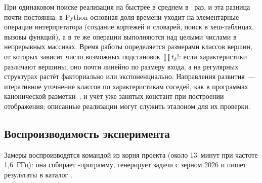 При одинаковом поиске реализация на \Cpp{} быстрее в среднем в \SpeedupGeo{}~раз, и эта разница почти постоянна: в Python основная доля времени уходит на элементарные операции интерпретатора (создание кортежей и словарей, поиск в хеш-таблицах, вызовы функций), а в \Cpp{} те же операции выполняются над целыми числами в непрерывных массивах.
Время работы \ISOMn{} определяется размерами классов вершин, от которых зависит число возможных подстановок $\prod t_k!$: если характеристики различают вершины, оно почти линейно по размеру входа, а на регулярных структурах растёт факториально или экспоненциально.
Направления развития~--- итеративное уточнение классов по характеристикам соседей, как в программах канонической разметки~\cite{McKayPiperno2014}, и учёт уже занятых констант при построении отображения; описанные реализации могут служить эталоном для их проверки.

\subsection{Воспроизводимость эксперимента}

Замеры воспроизводятся командой  из корня проекта (около 13~минут при частоте 1,6~ГГц): она собирает \Cpp{}-программу, генерирует задачи с зерном 2026 и пишет результаты в каталог .
